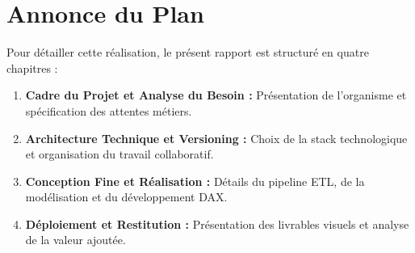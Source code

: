 \section*{Annonce du Plan}
Pour détailler cette réalisation, le présent rapport est structuré en quatre chapitres :
\begin{enumerate}
    \item \textbf{Cadre du Projet et Analyse du Besoin :} Présentation de l'organisme et spécification des attentes métiers.
    \item \textbf{Architecture Technique et Versioning :} Choix de la stack technologique et organisation du travail collaboratif.
    \item \textbf{Conception Fine et Réalisation :} Détails du pipeline ETL, de la modélisation et du développement DAX.
    \item \textbf{Déploiement et Restitution :} Présentation des livrables visuels et analyse de la valeur ajoutée.
\end{enumerate}
